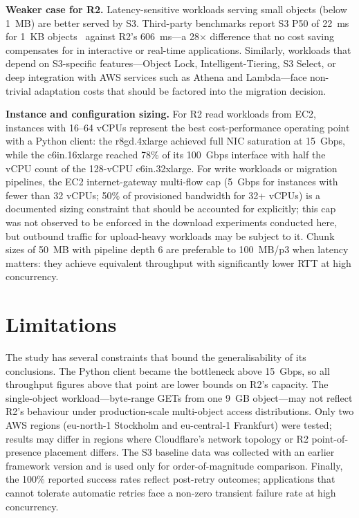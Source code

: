 \textbf{Weaker case for R2.} Latency-sensitive workloads serving small objects (below 1~MB) are better served by S3. Third-party benchmarks report S3 P50 of 22~ms for 1~KB objects~\cite{tigris-benchmark} against R2's 606~ms---a 28$\times$ difference that no cost saving compensates for in interactive or real-time applications. Similarly, workloads that depend on S3-specific features---Object Lock, Intelligent-Tiering, S3 Select, or deep integration with AWS services such as Athena and Lambda---face non-trivial adaptation costs that should be factored into the migration decision.

\textbf{Instance and configuration sizing.} For R2 read workloads from EC2, instances with 16--64 vCPUs represent the best cost-performance operating point with a Python client: the r8gd.4xlarge achieved full NIC saturation at 15~Gbps, while the c6in.16xlarge reached 78\% of its 100~Gbps interface with half the vCPU count of the 128-vCPU c6in.32xlarge. For write workloads or migration pipelines, the EC2 internet-gateway multi-flow cap (5~Gbps for instances with fewer than 32 vCPUs; 50\% of provisioned bandwidth for 32+ vCPUs) is a documented sizing constraint that should be accounted for explicitly; this cap was not observed to be enforced in the download experiments conducted here, but outbound traffic for upload-heavy workloads may be subject to it. Chunk sizes of 50~MB with pipeline depth 6 are preferable to 100~MB/p3 when latency matters: they achieve equivalent throughput with significantly lower RTT at high concurrency.

\section{Limitations}

The study has several constraints that bound the generalisability of its conclusions. The Python client became the bottleneck above 15~Gbps, so all throughput figures above that point are lower bounds on R2's capacity. The single-object workload---byte-range GETs from one 9~GB object---may not reflect R2's behaviour under production-scale multi-object access distributions. Only two AWS regions (eu-north-1 Stockholm and eu-central-1 Frankfurt) were tested; results may differ in regions where Cloudflare's network topology or R2 point-of-presence placement differs. The S3 baseline data was collected with an earlier framework version and is used only for order-of-magnitude comparison. Finally, the 100\% reported success rates reflect post-retry outcomes; applications that cannot tolerate automatic retries face a non-zero transient failure rate at high concurrency.

